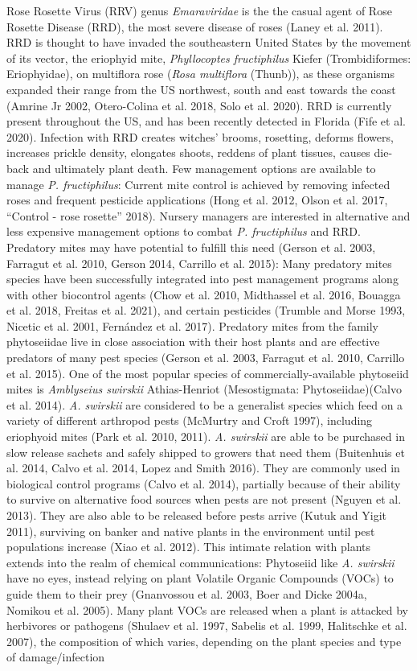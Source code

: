 \documentclass[12pt,final,CPage]{ufthesis}
\begin{document}
{  Rose Rosette Virus (RRV) genus \emph{Emaraviridae} is the the casual agent of Rose Rosette Disease (RRD), the most severe disease of roses (Laney et al. 2011). RRD is thought to have invaded the southeastern United States by the movement of its vector, the eriophyid mite, \emph{Phyllocoptes fructiphilus} Kiefer (Trombidiformes: Eriophyidae), on multiflora rose (\emph{Rosa multiflora} (Thunb)), as these organisms expanded their range from the US northwest, south and east towards the coast (Amrine Jr 2002, Otero-Colina et al. 2018, Solo et al. 2020). RRD is currently present throughout the US, and has been recently detected in Florida (Fife et al. 2020). Infection with RRD creates witches' brooms, rosetting, deforms flowers, increases prickle density, elongates shoots, reddens of plant tissues, causes die-back and ultimately plant death. Few management options are available to manage \emph{P. fructiphilus}: Current mite control is achieved by removing infected roses and frequent pesticide applications (Hong et al. 2012, Olson et al. 2017, {``Control - rose rosette''} 2018). Nursery managers are interested in alternative and less expensive management options to combat \emph{P. fructiphilus} and RRD. Predatory mites may have potential to fulfill this need (Gerson et al. 2003, Farragut et al. 2010, Gerson 2014, Carrillo et al. 2015): Many predatory mites species have been successfully integrated into pest management programs along with other biocontrol agents (Chow et al. 2010, Midthassel et al. 2016, Bouagga et al. 2018, Freitas et al. 2021), and certain pesticides (Trumble and Morse 1993, Nicetic et al. 2001, Fernández et al. 2017). Predatory mites from the family phytoseiidae live in close association with their host plants and are effective predators of many pest species (Gerson et al. 2003, Farragut et al. 2010, Carrillo et al. 2015). One of the most popular species of commercially-available phytoseiid mites is \emph{Amblyseius swirskii} Athias-Henriot (Mesostigmata: Phytoseiidae)(Calvo et al. 2014). \emph{A. swirskii} are considered to be a generalist species which feed on a variety of different arthropod pests (McMurtry and Croft 1997), including eriophyoid mites (Park et al. 2010, 2011). \emph{A. swirskii} are able to be purchased in slow release sachets and safely shipped to growers that need them (Buitenhuis et al. 2014, Calvo et al. 2014, Lopez and Smith 2016). They are commonly used in biological control programs (Calvo et al. 2014), partially because of their ability to survive on alternative food sources when pests are not present (Nguyen et al. 2013). They are also able to be released before pests arrive (Kutuk and Yigit 2011), surviving on banker and native plants in the environment until pest populations increase (Xiao et al. 2012). This intimate relation with plants extends into the realm of chemical communications: Phytoseiid like \emph{A. swirskii} have no eyes, instead relying on plant Volatile Organic Compounds (VOCs) to guide them to their prey (Gnanvossou et al. 2003, Boer and Dicke 2004a, Nomikou et al. 2005). Many plant VOCs are released when a plant is attacked by herbivores or pathogens (Shulaev et al. 1997, Sabelis et al. 1999, Halitschke et al. 2007), the composition of which varies, depending on the plant species and type of damage/infection }
\end{document}
